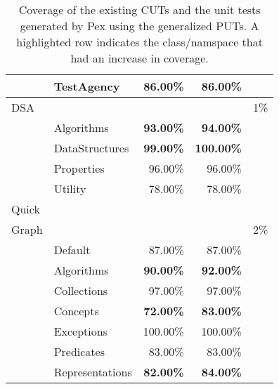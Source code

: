 \begin{table}[t]
\begin{tabular}{|l|l|r|r|c|}
						& TestAgency 							&  86.00\%					&  86.00\%					& 		\\ \cline{2-4}
\hline
\hline
DSA 				& \multicolumn{3}{|c|}{} 																					& 1\% \\ \hline
						& Algorithms							& \textbf{93.00\%}	&  \textbf{94.00\%}	& 		\\ \cline{2-4}
						& DataStructures					& \textbf{99.00\%}	& \textbf{100.00\%}	&			\\ \cline{2-4}
						& Properties							& 96.00\%						&  96.00\%					& 		\\ \cline{2-4}
						& Utility 								& 78.00\% 					&  78.00\%					&			\\ \cline{2-4}
\hline
\hline
Quick				& \multicolumn{3}{|c|}{} 														  						&			\\ 
Graph				& \multicolumn{3}{|c|}{} 																					&	2\%	\\ \hline
						& Default									& 87.00\%						&  87.00\%					& 		\\ \cline{2-4}
						& Algorithms							& \textbf{90.00\%}	&  \textbf{92.00\%}	&			\\ \cline{2-4}
						& Collections							& 97.00\%						&  97.00\%					& 		\\ \cline{2-4}
						& Concepts 								& \textbf{72.00\%} 	&  \textbf{83.00\%}	&			\\ \cline{2-4}
						& Exceptions 							&100.00\% 					& 100.00\%					&			\\ \cline{2-4}
						& Predicates 							& 83.00\% 					&  83.00\%					&			\\ \cline{2-4}
						& Representations					& \textbf{82.00\%}	&  \textbf{84.00\%} &			\\ \cline{2-4}
\hline
\hline
\end{tabular}
\caption{Coverage of the existing CUTs and the unit tests generated by Pex using the generalized PUTs. A highlighted row indicates the class/namspace that had an increase in coverage.} \vspace*{-3ex}
\label{tab:coverage}
\end{table}

